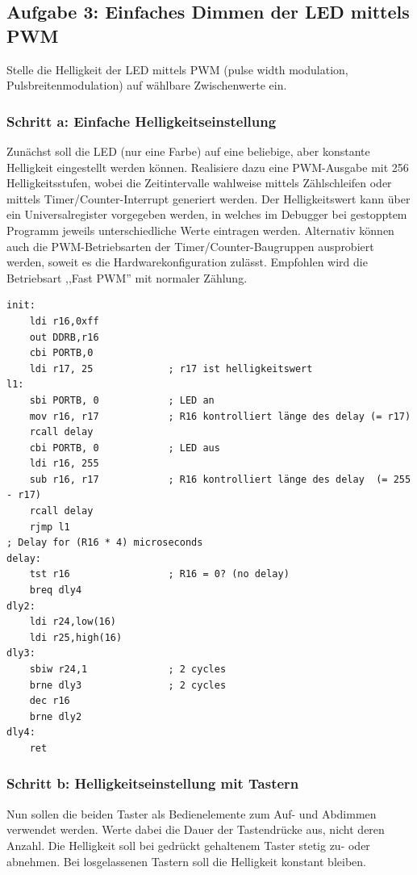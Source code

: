 \documentclass[a4paper,12pt,titlepage]{scrartcl}
\begin{document}
\subsection*{Aufgabe 3: Einfaches Dimmen der LED mittels PWM}
Stelle die Helligkeit der LED mittels PWM (pulse width modulation, Pulsbreitenmodulation) auf wählbare Zwischenwerte ein.

\subsubsection*{Schritt a: Einfache Helligkeitseinstellung}
Zunächst soll die LED (nur eine Farbe) auf eine beliebige, aber konstante Helligkeit eingestellt werden können. Realisiere dazu eine PWM-Ausgabe mit 256 Helligkeitsstufen, wobei die Zeitintervalle wahlweise mittels Zählschleifen oder mittels Timer/Counter-Interrupt generiert werden. Der Helligkeitswert kann über ein Universalregister vorgegeben werden, in welches im Debugger bei gestopptem Programm jeweils unterschiedliche Werte eintragen werden.
Alternativ können auch die PWM-Betriebsarten der Timer/Counter-Baugruppen ausprobiert werden, soweit es die Hardwarekonfiguration zulässt. Empfohlen wird die Betriebsart ,,Fast PWM'' mit normaler Zählung.
\begin{lstlisting}[basicstyle=\tiny]
init:
    ldi r16,0xff            
    out DDRB,r16
    cbi PORTB,0      
    ldi r17, 25             ; r17 ist helligkeitswert
l1:     
    sbi PORTB, 0            ; LED an
    mov r16, r17            ; R16 kontrolliert länge des delay (= r17)
    rcall delay
    cbi PORTB, 0            ; LED aus
    ldi r16, 255
    sub r16, r17            ; R16 kontrolliert länge des delay  (= 255 - r17)
    rcall delay
    rjmp l1
; Delay for (R16 * 4) microseconds
delay:  
    tst r16                 ; R16 = 0? (no delay)
    breq dly4
dly2:       
    ldi r24,low(16)
    ldi r25,high(16)
dly3:       
    sbiw r24,1              ; 2 cycles
    brne dly3               ; 2 cycles
    dec r16
    brne dly2
dly4:       
    ret  
\end{lstlisting}


\subsubsection*{Schritt b: Helligkeitseinstellung mit Tastern}
Nun sollen die beiden Taster als Bedienelemente zum Auf- und Abdimmen verwendet werden. Werte dabei die Dauer der Tastendrücke aus, nicht deren Anzahl. Die Helligkeit soll bei gedrückt gehaltenem Taster stetig zu- oder abnehmen. Bei losgelassenen Tastern soll die Helligkeit konstant bleiben.
\end{document}
